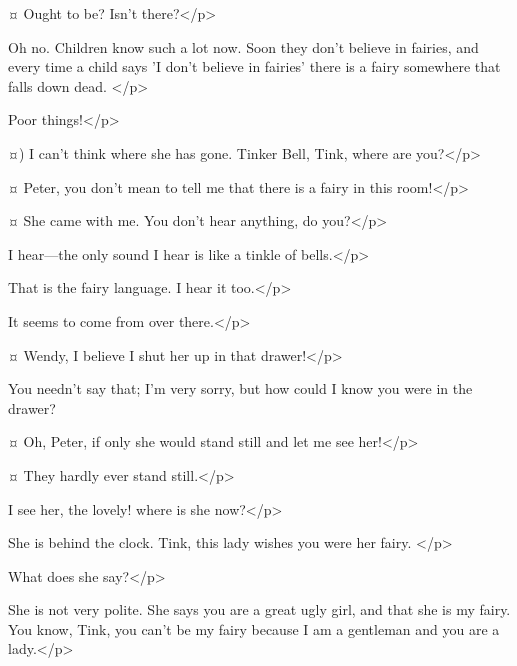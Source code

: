 \begin{drama}
\wendyspeaks {}¤
Ought to be?
Isn't there?</p>

\peterspeaks
Oh no.
Children know such a lot now.
Soon they don't believe in fairies, and every time a child says 'I don't believe in fairies' there is a fairy somewhere that falls down dead.
</p>

\wendyspeaks
Poor things!</p>

\peterspeaks {}¤)
I can't think where she has gone.
Tinker Bell, Tink, where are you?</p>

\wendyspeaks {}¤
Peter, you don't mean to tell me that there is a fairy in this room!</p>

\peterspeaks {}¤
She came with me.
You don't hear anything, do you?</p>

\wendyspeaks
I hear—the only sound I hear is like a tinkle of bells.</p>

\peterspeaks
That is the fairy language.
I hear it too.</p>

\wendyspeaks
It seems to come from over there.</p>

\peterspeaks
{}¤
Wendy, I believe I shut her up in that drawer!</p>


You needn't say that; I'm very sorry, but how could I know you were in the drawer?


\wendyspeaks {}¤
Oh, Peter, if only she would stand still and let me see her!</p>

\peterspeaks {}¤
They hardly ever stand still.</p>


\wendyspeaks
I see her, the lovely!
where is she now?</p>

\peterspeaks
She is behind the clock.
Tink, this lady wishes you were her fairy.
</p>

\wendyspeaks
What does she say?</p>

\peterspeaks
She is not very polite.
She says you are a great ugly girl, and that she is my fairy.
You know, Tink, you can't be my fairy because I am a gentleman and you are a lady.</p>


\end{drama}
